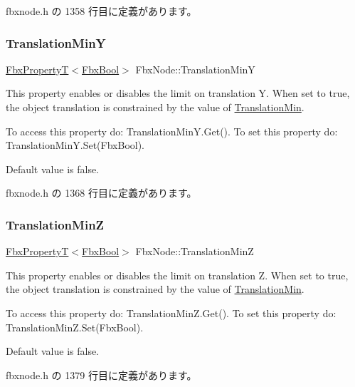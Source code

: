  fbxnode.\+h の 1358 行目に定義があります。

\mbox{\label{class_fbx_node_a61c15c2ecc1e454320759c68e95e44b3}} 
\subsubsection{\texorpdfstring{Translation\+MinY}{TranslationMinY}}
{\footnotesize\ttfamily \hyperlink{class_fbx_property_t}{Fbx\+PropertyT}$<$\hyperlink{fbxtypes_8h_a92e0562b2fe33e76a242f498b362262e}{Fbx\+Bool}$>$ Fbx\+Node\+::\+Translation\+MinY}

This property enables or disables the limit on translation Y. When set to {\ttfamily true}, the object translation is constrained by the value of \hyperlink{class_fbx_node_aaaa913d4332c2136f50ae15356521413}{Translation\+Min}.

To access this property do\+: Translation\+Min\+Y.\+Get(). To set this property do\+: Translation\+Min\+Y.\+Set(\+Fbx\+Bool).

Default value is false. 

 fbxnode.\+h の 1368 行目に定義があります。

\mbox{\label{class_fbx_node_a0e89c2861ae7bb58014dd0f4ffe069be}} 
\subsubsection{\texorpdfstring{Translation\+MinZ}{TranslationMinZ}}
{\footnotesize\ttfamily \hyperlink{class_fbx_property_t}{Fbx\+PropertyT}$<$\hyperlink{fbxtypes_8h_a92e0562b2fe33e76a242f498b362262e}{Fbx\+Bool}$>$ Fbx\+Node\+::\+Translation\+MinZ}

This property enables or disables the limit on translation Z. When set to {\ttfamily true}, the object translation is constrained by the value of \hyperlink{class_fbx_node_aaaa913d4332c2136f50ae15356521413}{Translation\+Min}.

To access this property do\+: Translation\+Min\+Z.\+Get(). To set this property do\+: Translation\+Min\+Z.\+Set(\+Fbx\+Bool).

Default value is false. 

 fbxnode.\+h の 1379 行目に定義があります。

